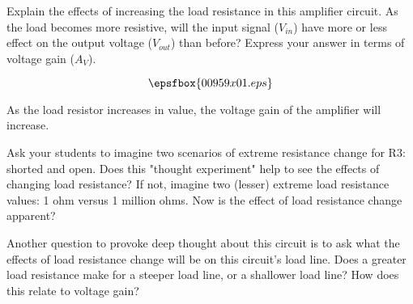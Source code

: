 

Explain the effects of increasing the load resistance in this amplifier circuit.  As the load becomes more resistive, will the input signal ($V_{in}$) have more or less effect on the output voltage ($V_{out}$) than before?  Express your answer in terms of voltage gain ($A_V$).

$$\epsfbox{00959x01.eps}$$







As the load resistor increases in value, the voltage gain of the amplifier will increase.







Ask your students to imagine two scenarios of extreme resistance change for R3: shorted and open.  Does this "thought experiment" help to see the effects of changing load resistance?  If not, imagine two (lesser) extreme load resistance values: 1 ohm versus 1 million ohms.  Now is the effect of load resistance change apparent?

Another question to provoke deep thought about this circuit is to ask what the effects of load resistance change will be on this circuit's load line.  Does a greater load resistance make for a steeper load line, or a shallower load line?  How does this relate to voltage gain?




